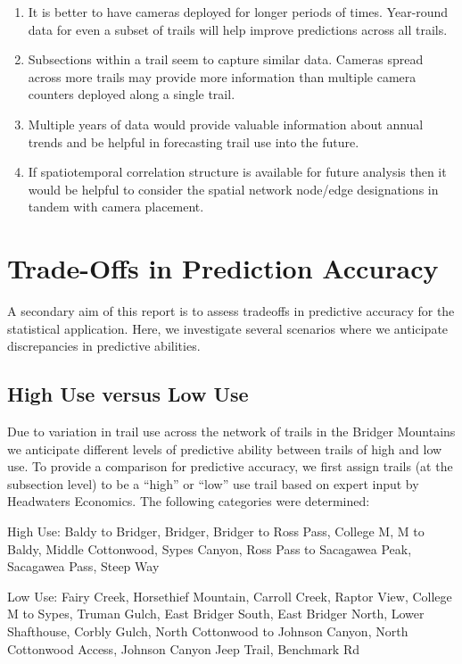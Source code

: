 \documentclass[
]{book}
\providecommand{\tightlist}{%
  \setlength{\itemsep}{0pt}\setlength{\parskip}{0pt}}
\begin{document}
\begin{enumerate}
\def\labelenumi{\arabic{enumi}.}
\tightlist
\item
  It is better to have cameras deployed for longer periods of times. Year-round data for even a subset of trails will help improve predictions across all trails.
\item
  Subsections within a trail seem to capture similar data. Cameras spread across more trails may provide more information than multiple camera counters deployed along a single trail.
\item
  Multiple years of data would provide valuable information about annual trends and be helpful in forecasting trail use into the future.
\item
  If spatiotemporal correlation structure is available for future analysis then it would be helpful to consider the spatial network node/edge designations in tandem with camera placement.
\end{enumerate}

\hypertarget{TradeOff}{%
\chapter{Trade-Offs in Prediction Accuracy}\label{TradeOff}}

A secondary aim of this report is to assess tradeoffs in predictive accuracy for the statistical application. Here, we investigate several scenarios where we anticipate discrepancies in predictive abilities.

\hypertarget{high-use-versus-low-use}{%
\section{High Use versus Low Use}\label{high-use-versus-low-use}}

Due to variation in trail use across the network of trails in the Bridger Mountains we anticipate different levels of predictive ability between trails of high and low use. To provide a comparison for predictive accuracy, we first assign trails (at the subsection level) to be a ``high'' or ``low'' use trail based on expert input by Headwaters Economics. The following categories were determined:

High Use: Baldy to Bridger, Bridger, Bridger to Ross Pass, College M, M to Baldy, Middle Cottonwood, Sypes Canyon, Ross Pass to Sacagawea Peak, Sacagawea Pass, Steep Way

Low Use: Fairy Creek, Horsethief Mountain, Carroll Creek, Raptor View, College M to Sypes, Truman Gulch, East Bridger South, East Bridger North, Lower Shafthouse, Corbly Gulch, North Cottonwood to Johnson Canyon, North Cottonwood Access, Johnson Canyon Jeep Trail, Benchmark Rd
\end{document}
